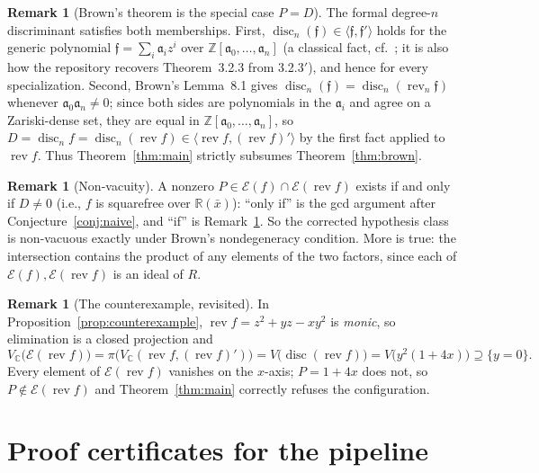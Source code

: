 \documentclass[11pt,a4paper]{article}
\theoremstyle{definition}
\newtheorem{remark}[theorem]{Remark}
\newcommand{\R}{\mathbb{R}}
\newcommand{\C}{\mathbb{C}}
\newcommand{\Z}{\mathbb{Z}}
\newcommand{\xb}{\bar{x}}
\newcommand{\disc}{\operatorname{disc}}
\newcommand{\rev}{\operatorname{rev}}
\newcommand{\E}{\mathcal{E}}
\newcommand{\ideal}[1]{\langle #1\rangle}
\begin{document}
\begin{remark}[Brown's theorem is the special case $P = D$]\label{rem:recover}
The formal degree-$n$ discriminant satisfies both memberships. First,
$\disc_n(\mathfrak f) \in \ideal{\mathfrak f, \mathfrak f'}$ holds for the
generic polynomial $\mathfrak f = \sum_i \mathfrak a_i z^i$ over
$\Z[\mathfrak a_0,\dots,\mathfrak a_n]$ (a classical fact, cf.\
\cite{Jouanolou}; it is also how the repository recovers Theorem~3.2.3 from
3.2.3$'$), and hence for every specialization. Second, Brown's Lemma~8.1
gives $\disc_n(\mathfrak f) = \disc_n(\rev_n \mathfrak f)$ whenever
$\mathfrak a_0 \mathfrak a_n \neq 0$; since both sides are polynomials in the
$\mathfrak a_i$ and agree on a Zariski-dense set, they are equal in
$\Z[\mathfrak a_0,\dots,\mathfrak a_n]$, so $D = \disc_n f = \disc_n(\rev f)
\in \ideal{\rev f, (\rev f)'}$ by the first fact applied to $\rev f$. Thus
Theorem~\ref{thm:main} strictly subsumes Theorem~\ref{thm:brown}.
\end{remark}

\begin{remark}[Non-vacuity]\label{rem:nonvacuous}
A nonzero $P \in \E(f) \cap \E(\rev f)$ exists if and only if $D \neq 0$
(i.e., $f$ is squarefree over $\R(\xb)$): ``only if'' is the gcd argument
after Conjecture~\ref{conj:naive}, and ``if'' is Remark~\ref{rem:recover}.
So the corrected hypothesis class is non-vacuous exactly under Brown's
nondegeneracy condition. More is true: the intersection contains the product
of any elements of the two factors, since each of
$\E(f), \E(\rev f)$ is an ideal of $R$.
\end{remark}

\begin{remark}[The counterexample, revisited]\label{rem:cex-revisited}
In Proposition~\ref{prop:counterexample}, $\rev f = z^2 + yz - xy^2$ is
\emph{monic}, so elimination is a closed projection and
\[
  V_\C\bigl(\E(\rev f)\bigr)
   = \pi\bigl(V_\C(\rev f, (\rev f)')\bigr)
   = V\bigl(\disc(\rev f)\bigr) = V\bigl(y^2(1+4x)\bigr) \supseteq \{y=0\} .
\]
Every element of $\E(\rev f)$ vanishes on the $x$-axis; $P = 1+4x$ does not,
so $P \notin \E(\rev f)$ and Theorem~\ref{thm:main} correctly refuses the
configuration.
\end{remark}

\section{Proof certificates for the pipeline}\label{sec:certificates}
\end{document}
